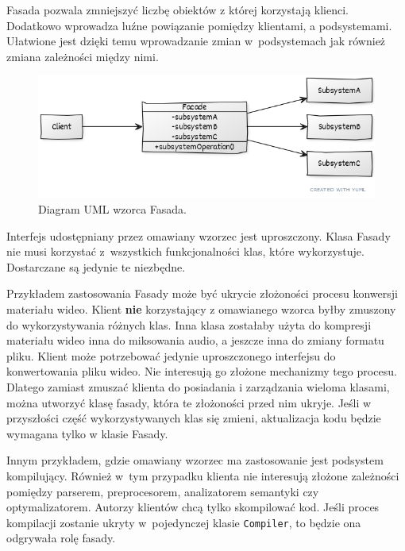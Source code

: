 Fasada pozwala zmniejszyć liczbę obiektów z której korzystają klienci. Dodatkowo wprowadza luźne powiązanie pomiędzy klientami, a podsystemami. Ułatwione jest dzięki temu wprowadzanie zmian w~podsystemach jak również zmiana zależności między nimi. 

\begin{figure}[hbt!]
	\centering
	\includegraphics[width=0.8\linewidth]{images/FacadeUml}
	\caption{Diagram UML wzorca Fasada.}
	\label{lab3/fig/FacadeUml}
\end{figure}
%

Interfejs udostępniany przez omawiany wzorzec jest uproszczony. Klasa Fasady nie musi korzystać z~wszystkich funkcjonalności klas, które wykorzystuje. Dostarczane są jedynie te niezbędne. 

Przykładem zastosowania Fasady może być ukrycie złożoności procesu konwersji materiału wideo. Klient \textbf{nie} korzystający z omawianego wzorca byłby zmuszony do wykorzystywania różnych klas. Inna klasa zostałaby użyta do kompresji materiału wideo inna do miksowania audio, a jeszcze inna do zmiany formatu pliku. Klient może potrzebować jedynie uproszczonego interfejsu do konwertowania pliku wideo. Nie interesują go złożone mechanizmy tego procesu. Dlatego zamiast zmuszać klienta do posiadania i zarządzania wieloma klasami, można utworzyć klasę fasady, która te złożoności przed nim ukryje. Jeśli w przyszłości część wykorzystywanych klas się zmieni, aktualizacja kodu będzie wymagana tylko w klasie Fasady.

Innym przykładem, gdzie omawiany wzorzec ma zastosowanie jest podsystem kompilujący. Również w~tym przypadku klienta nie interesują złożone zależności pomiędzy parserem, preprocesorem, analizatorem semantyki czy optymalizatorem. Autorzy klientów chcą tylko skompilować kod. Jeśli proces kompilacji zostanie ukryty w~pojedynczej klasie \texttt{Compiler}, to będzie ona odgrywała rolę fasady.

